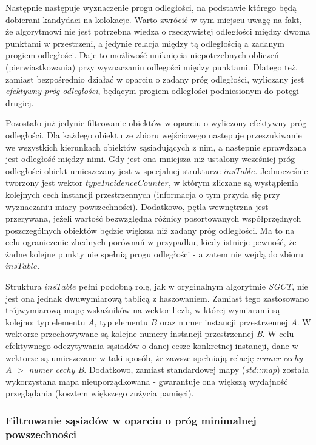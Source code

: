 \documentclass[12pt]{article}
\begin{document}
Następnie następuje wyznaczenie progu odległości, na podstawie którego będą dobierani kandydaci na kolokacje. Warto zwrócić w tym miejscu uwagę na fakt, że algorytmowi nie jest potrzebna wiedza o rzeczywistej odległości między dwoma punktami w przestrzeni, a jedynie relacja między tą odległością a zadanym progiem odległości. Daje to możliwość uniknięcia niepotrzebnych obliczeń (pierwiastkowania) przy wyznaczaniu odlegości między punktami. Dlatego też, zamiast bezpośrednio działać w oparciu o zadany próg odległości, wyliczany jest \textit{efektywny próg odległości}, będącym progiem odległości podniesionym do potęgi drugiej. 

Pozostało już jedynie filtrowanie obiektów w oparciu o wyliczony efektywny próg odległości. Dla każdego obiektu ze zbioru wejściowego następuje przeszukiwanie we wszystkich kierunkach obiektów sąsiadujących z nim, a nastepnie sprawdzana jest odległość między nimi. Gdy jest ona mniejsza niż ustalony wcześniej próg odległości obiekt umieszczany jest w specjalnej strukturze $ insTable $. Jednocześnie tworzony jest wektor $ typeIncidenceCounter$, w którym zliczane są wystąpienia kolejnych cech instancji przestrzennych (informacja o tym przyda się przy wyznaczaniu miary powszechności). Dodatkowo, pętla wewnętrzna jest przerywana, jeżeli wartość bezwzględna różnicy posortowanych współprzędnych poszczególnych obiektów będzie większa niż zadany próg odległości. Ma to na celu ograniczenie zbednych porównań w przypadku, kiedy istnieje pewność, że żadne kolejne punkty nie spełnią progu odległości - a zatem nie wejdą do zbioru $ insTable $.
 
Struktura $ insTable $ pełni podobną rolę, jak w oryginalnym algorytmie \textit{SGCT}, nie jest ona jednak dwuwymiarową tablicą z haszowaniem. Zamiast tego zastosowano trójwymiarową mapę wskaźników na wektor liczb, w której wymiarami są kolejno: typ elementu $ A $, typ elementu $ B $ oraz numer instancji przestrzennej $ A $.  W wektorze przechowywane są kolejne numery instancji przestrzennej \textit{B}. W celu efektywnego odczytywania sąsiadów o danej cesze konkretnej instancji, dane w wektorze są umieszczane w taki sposób, że zawsze spełniają relację \textit{numer cechy A} $ > $ \textit{numer cechy B}. Dodatkowo, zamiast standardowej mapy (\textit{std::map}) została wykorzystana mapa nieuporządkowana - gwarantuje ona większą wydajność przeglądania (kosztem większego zużycia pamięci).

\subsubsection{Filtrowanie sąsiadów w oparciu o próg minimalnej powszechności}
\end{document}
